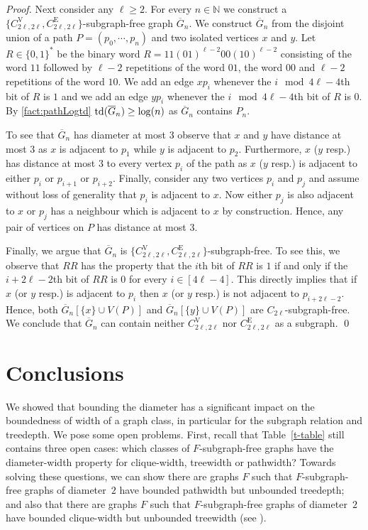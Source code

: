 \documentclass[runningheads,envcountsame]{llncs}
\newcommand{\sharedVertex}[1]{C^{\mathrm{V}}_{#1}}
\newcommand{\sharedEdge}[1]{C^{\mathrm{E}}_{#1}}
\newcommand{\td}{{\textup{td}}}
\begin{document}
\begin{proof}
    Next consider any $\ell\geq 2$.
    For every $n \in \mathbb{N}$ we construct a $\{\sharedVertex{2\ell,2\ell}, \sharedEdge{2\ell,2\ell}\}$-subgraph-free graph $\overline{G}_n$. We construct $\overline{G}_n$ from the disjoint union of a path $P = (p_0, \cdots, p_n)$ and two isolated vertices $x$ and $y$. Let $R\in \{0,1\}^\ast$ be the binary word $R=11 (01)^{\ell-2} 00 (10)^{\ell-2}$ consisting of the word $11$ followed by $\ell-2$ repetitions of the word $01$, the word $00$ and $\ell-2$ repetitions of the word $10$. We add an edge $xp_i$ whenever the $i\mod 4\ell-4$th bit of $R$ is $1$ and we add an edge $yp_i$ whenever the $i\mod 4\ell-4$th bit of $R$ is $0$. By \cref{fact:pathLogtd} $\td(\overline{G}_n)\geq \log(n)$ as $\overline{G}_n$ contains $P_n$.

    To see that $\overline{G}_n$ has diameter at most $3$ observe that $x$ and $y$ have distance at most $3$ as $x$ is adjacent to $p_1$ while $y$ is adjacent to $p_2$. Furthermore, $x$ ($y$ resp.) has distance at most $3$ to every vertex $p_i$ of the path as $x$ ($y$ resp.) is adjacent to either $p_i$ or $p_{i+1}$ or $p_{i+2}$. Finally, consider any two vertices $p_i$ and $p_j$ and assume without loss of generality that $p_i$ is adjacent to $x$. Now either $p_j$ is also adjacent to $x$ or $p_j$ has a neighbour which is adjacent to $x$
    by construction. Hence, any pair of vertices on $P$ has distance at most $3$.  

    Finally, we argue that $\overline{G}_n$ is $\{\sharedVertex{2\ell,2\ell}, \sharedEdge{2\ell,2\ell}\}$-subgraph-free. To see this, we observe that $RR$ has the property that the $i$th bit of $RR$ is $1$ if and only if the $i+2\ell-2$th bit of $RR$ is $0$ for every $i\in [4\ell-4]$. This directly implies that if $x$ (or $y$ resp.) is adjacent to $p_i$ then $x$ (or $y$ resp.) is not adjacent to $p_{i+2\ell-2}$. Hence, both $\overline{G}_n[\{x\}\cup V(P)]$ and $\overline{G}_n[\{y\}\cup V(P)]$ are $C_{2\ell}$-subgraph-free. We conclude that $\overline{G}_n$ can contain neither $\sharedVertex{2\ell,2\ell}$ nor $\sharedEdge{2\ell,2\ell}$ as a subgraph.
    \qed
\end{proof}

 
\section{Conclusions}\label{s-con}


We showed that bounding the diameter has a significant impact on the boundedness of width of a graph class, in particular for the subgraph relation and treedepth. We pose some open problems.
First, recall that Table~\ref{t-table} still contains three open cases: which classes of $F$-subgraph-free graphs have the diameter-width property for clique-width, treewidth or pathwidth? Towards solving these questions, we can show there are graphs $F$ such that $F$-subgraph-free graphs of diameter~$2$ have bounded pathwidth but unbounded treedepth; and also that 
there are graphs $F$ such that $F$-subgraph-free graphs of diameter~$2$ have bounded clique-width but unbounded treewidth 
(see ).
\end{document}

